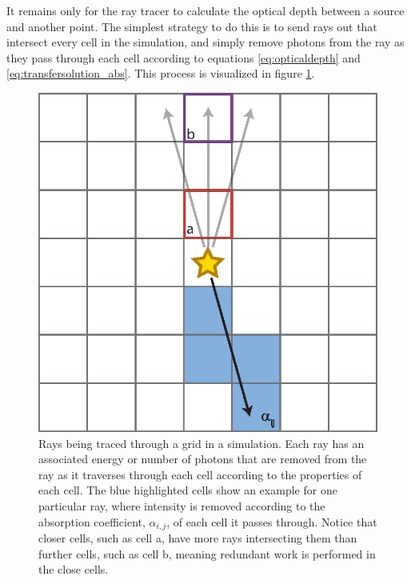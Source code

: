 It remains only for the ray tracer to calculate the optical depth between a source and another point. The simplest strategy to do this is to send rays out that intersect every cell in the simulation, and simply remove photons from the ray as they pass through each cell according to equations \ref{eq:opticaldepth} and \ref{eq:transfersolution_abs}. This process is visualized in figure \ref{fig:raytracing}.

\begin{figure}
\includegraphics[width=\textwidth]{graphics/ray_flux.eps}
\caption[A visualization of ray tracing.]{Rays being traced through a grid in a simulation. Each ray has an associated energy or number of photons that are removed from the ray as it traverses through each cell according to the properties of each cell. The blue highlighted cells show an example for one particular ray, where intensity is removed according to the absorption coefficient, $\alpha_{i,j}$, of each cell it passes through. Notice that closer cells, such as cell a, have more rays intersecting them than further cells, such as cell b, meaning redundant work is performed in the close cells.}
\label{fig:raytracing}
\end{figure}


